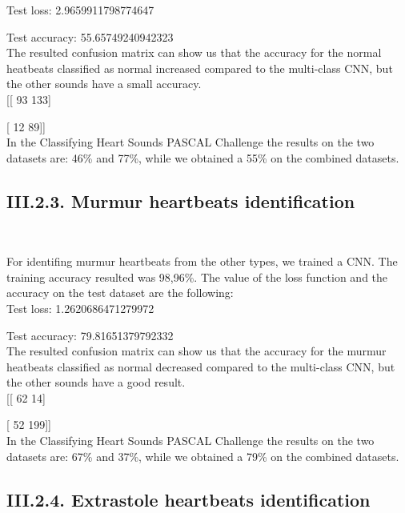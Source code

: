 \documentclass[11pt, a4papper]{report}
\theoremstyle{plain}
\theoremstyle{definition}
\theoremstyle{definition}
\theoremstyle{proposition}
\begin{document}
Test loss: 2.9659911798774647
\

Test accuracy: 55.65749240942323
\\

The resulted confusion matrix can show us that the accuracy for the normal heatbeats classified as normal increased compared to the multi-class CNN, but the other sounds have a small accuracy.
\\

[[ 93 133]
\

 [ 12  89]]
\\

In the Classifying Heart Sounds PASCAL Challenge the results on the two datasets are: 46\% and 77\%, while we obtained a 55\% on the combined datasets.

\subsection*{III.2.3. Murmur heartbeats identification}

\

For identifing murmur heartbeats from the other types, we trained a CNN. The training accuracy resulted was 98,96\%. The value of the loss function and the accuracy on the test dataset are the following:
\\

Test loss: 1.2620686471279972
\

Test accuracy: 79.81651379792332
\\

The resulted confusion matrix can show us that the accuracy for the murmur heatbeats classified as normal decreased compared to the multi-class CNN, but the other sounds have a good result.
\\

[[ 62  14]
\

 [ 52 199]]
\\

In the Classifying Heart Sounds PASCAL Challenge the results on the two datasets are: 67\% and 37\%, while we obtained a 79\% on the combined datasets.
\\

\subsection*{III.2.4. Extrastole heartbeats identification}
\end{document}
